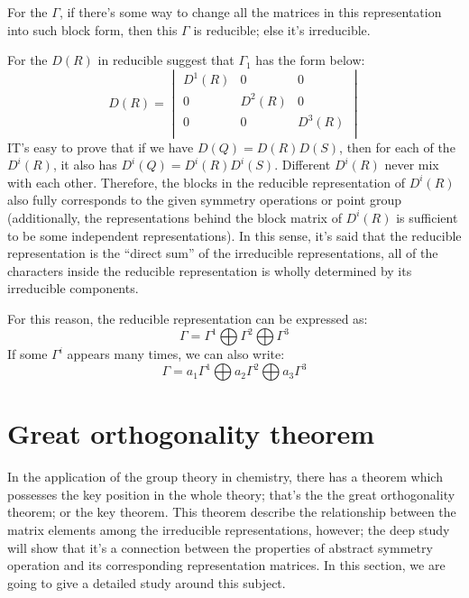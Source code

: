 For the $\Gamma$, if there's some way to change all the matrices in
this representation into such block form, then this $\Gamma$ is
reducible; else it's irreducible.

For the $D(R)$ in reducible suggest that $\Gamma_{1}$ has the form
below:
\begin{equation}\label{}
  D(R)       = \begin{vmatrix}
    D^{1}(R) & 0        & 0        \\
    0        & D^{2}(R) & 0        \\
    0        & 0        & D^{3}(R) \\
  \end{vmatrix}
\end{equation}
IT's easy to prove that if we have $D(Q) = D(R)D(S)$, then for each of
the $D^{i}(R)$, it also has $D^{i}(Q) = D^{i}(R)D^{i}(S)$.  Different
$D^{i}(R)$ never mix with each other. Therefore, the blocks in the
reducible representation of $D^{i}(R)$ also fully corresponds to the
given symmetry operations or point group (additionally, the
representations behind the block matrix of $D^{i}(R)$ is sufficient to
be some independent representations). In this sense, it's said that
the reducible representation is the ``direct sum'' of the irreducible
representations, all of the characters inside the reducible
representation is wholly determined by its irreducible components.

For this reason, the reducible representation can be expressed as:
\begin{equation}\label{}
  \Gamma = \Gamma^{1} \bigoplus \Gamma^{2} \bigoplus \Gamma^{3}
\end{equation}
If some $\Gamma^{i}$ appears many times, we can also write:
\begin{equation}\label{}
  \Gamma = a_{1}\Gamma^{1} \bigoplus a_{2}\Gamma^{2} \bigoplus
  a_{3}\Gamma^{3}
\end{equation}

\section{Great orthogonality theorem}
%
%
%
In the application of the group theory in chemistry, there has a
theorem which possesses the key position in the whole theory; that's
the the great orthogonality theorem; or the key theorem. This theorem
describe the relationship between the matrix elements among the
irreducible representations, however; the deep study will show that
it's a connection between the properties of abstract symmetry
operation and its corresponding representation matrices. In this
section, we are going to give a detailed study around this subject.


